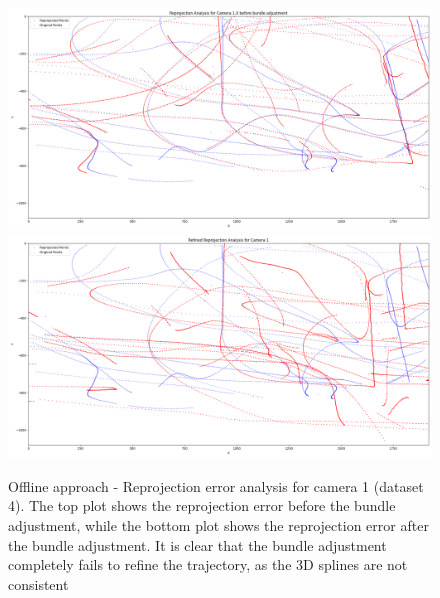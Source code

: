 \documentclass[11pt]{article}
\begin{document}
\begin{figure}[h]
    \centering
    \includegraphics[width=\textwidth]{../plots/dataset4/reprojection_analysis_camera_1_before_ba_.png}
    \includegraphics[width=\textwidth]{../plots/dataset4/reprojection_analysis_camera_1.png}
    \caption{Offline approach - Reprojection error analysis for camera 1 (dataset 4). The top plot shows the reprojection error before the bundle adjustment, while the bottom plot shows the reprojection error after the bundle adjustment. It is clear that the bundle adjustment completely fails to refine the trajectory, as the 3D splines are not consistent}
    \label{fig:bad_ba}
\end{figure}
\end{document}
